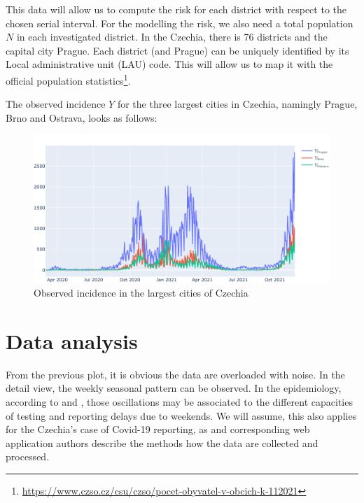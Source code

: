 \documentclass[
  digital, %
  oneside, %
  lof,     %
  lot,     %
]{fithesis4}
\begin{document}
This data will allow us to compute the risk for each district 
with respect to the chosen serial interval. 
For the modelling the risk, we also need a total population 
$N$ in each investigated district.
In the Czechia, there is 76 districts and the capital city Prague. 
Each district (and Prague) can be uniquely identified by its 
Local administrative unit (LAU) code. 
This will allow us to map it with the official population 
statistics\footnote{\url{https://www.czso.cz/csu/czso/pocet-obyvatel-v-obcich-k-112021}}.

The observed incidence $Y$ for the three largest 
cities in Czechia, namingly Prague, Brno and Ostrava, looks as 
follows:

\begin{figure}[h]
  \begin{center}
    \includegraphics[width=\textwidth]{images/largest-cities-incidence.png}
  \end{center}
  \caption{Observed incidence in the largest cities of Czechia}
  \label{fig:largest-cities-incidence}
\end{figure}


\section{Data analysis}

From the previous plot, it is obvious the data are overloaded 
with noise. 
In the detail view, the weekly seasonal pattern can be observed. 
In the epidemiology, according to \cite{liu2021} and \cite{annunziato2020}, 
those oscillations may be associated to the different capacities 
of testing and reporting delays due to weekends. 
We will assume, this also applies for the Czechia's case of 
Covid-19 reporting, as \cite{komenda2020} and corresponding web 
application authors describe the methods how the data are
collected and processed.
\end{document}
